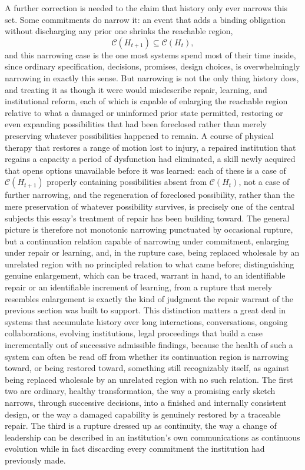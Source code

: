\documentclass[11pt]{article}
\begin{document}
A further correction is needed to the claim that history only ever narrows this set. Some commitments do narrow it: an event that adds a binding obligation without discharging any prior one shrinks the reachable region,
$$\mathcal{C}(H_{t+1}) \subseteq \mathcal{C}(H_t),$$
and this narrowing case is the one most systems spend most of their time inside, since ordinary specification, decisions, promises, design choices, is overwhelmingly narrowing in exactly this sense. But narrowing is not the only thing history does, and treating it as though it were would misdescribe repair, learning, and institutional reform, each of which is capable of enlarging the reachable region relative to what a damaged or uninformed prior state permitted, restoring or even expanding possibilities that had been foreclosed rather than merely preserving whatever possibilities happened to remain. A course of physical therapy that restores a range of motion lost to injury, a repaired institution that regains a capacity a period of dysfunction had eliminated, a skill newly acquired that opens options unavailable before it was learned: each of these is a case of $\mathcal{C}(H_{t+1})$ properly containing possibilities absent from $\mathcal{C}(H_t)$, not a case of further narrowing, and the regeneration of foreclosed possibility, rather than the mere preservation of whatever possibility survives, is precisely one of the central subjects this essay's treatment of repair has been building toward. The general picture is therefore not monotonic narrowing punctuated by occasional rupture, but a continuation relation capable of narrowing under commitment, enlarging under repair or learning, and, in the rupture case, being replaced wholesale by an unrelated region with no principled relation to what came before; distinguishing genuine enlargement, which can be traced, warrant in hand, to an identifiable repair or an identifiable increment of learning, from a rupture that merely resembles enlargement is exactly the kind of judgment the repair warrant of the previous section was built to support. This distinction matters a great deal in systems that accumulate history over long interactions, conversations, ongoing collaborations, evolving institutions, legal proceedings that build a case incrementally out of successive admissible findings, because the health of such a system can often be read off from whether its continuation region is narrowing toward, or being restored toward, something still recognizably itself, as against being replaced wholesale by an unrelated region with no such relation. The first two are ordinary, healthy transformation, the way a promising early sketch narrows, through successive decisions, into a finished and internally consistent design, or the way a damaged capability is genuinely restored by a traceable repair. The third is a rupture dressed up as continuity, the way a change of leadership can be described in an institution's own communications as continuous evolution while in fact discarding every commitment the institution had previously made.
\end{document}
